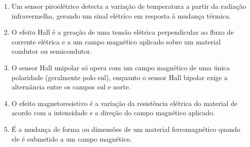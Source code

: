 \begin{enumerate}[label=\textbf{\arabic*)}, leftmargin=*]
    \item Um sensor piroelétrico detecta a variação de temperatura a partir da radiação infravermelha, gerando um sinal elétrico em resposta à mudança térmica.

    \item O efeito Hall é a geração de uma tensão elétrica perpendicular ao fluxo de corrente elétrica e a um campo magnético aplicado sobre um material condutor ou semicondutor.

    \item O sensor Hall unipolar só opera com um campo magnético de uma única polaridade (geralmente polo sul), enquanto o sensor Hall bipolar exige a alternância entre os campos sul e norte.

    \item O efeito magnetoresistivo é a variação da resistência elétrica do material de acordo com a intensidade e a direção do campo magnético aplicado.

    \item É a mudança de forma ou dimensões de um material ferromagnético quando ele é submetido a um campo magnético.

\end{enumerate}
